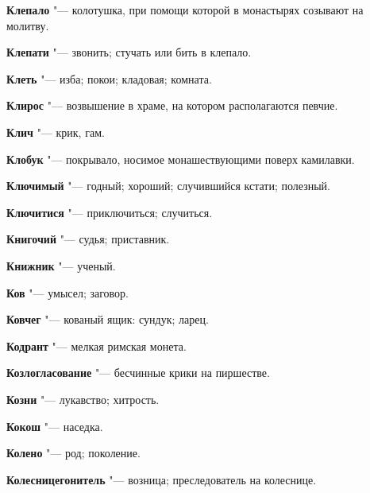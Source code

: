\begin{mymulticols}{2}
\noindent\textbf{Клепало} "--- колотушка, при помощи которой в монастырях созывают на молитву. 




\noindent\textbf{Клепати} "--- звонить; стучать или бить в клепало. 




\noindent\textbf{Клеть} "--- изба; покои; кладовая; комната. 




\noindent\textbf{Клирос} "--- возвышение в храме, на котором располагаются певчие. 




\noindent\textbf{Клич} "--- крик, гам. 




\noindent\textbf{Клобук} "--- покрывало, носимое монашествующими поверх камилавки. 




\noindent\textbf{Ключимый} "--- годный; хороший; случившийся кстати; полезный. 




\noindent\textbf{Ключитися} "--- приключиться; случиться. 




\noindent\textbf{Книгочий} "--- судья; приставник. 




\noindent\textbf{Книжник} "--- ученый. 




\noindent\textbf{Ков} "--- умысел; заговор. 




\noindent\textbf{Ковчег} "--- кованый ящик: сундук; ларец. 




\noindent\textbf{Кодрант} "--- мелкая римская монета. 




\noindent\textbf{Козлогласование} "--- бесчинные крики на пиршестве. 




\noindent\textbf{Козни} "--- лукавство; хитрость. 




\noindent\textbf{Кокош} "--- наседка. 




\noindent\textbf{Колено} "--- род; поколение. 




\noindent\textbf{Колесницегонитель} "--- возница; преследователь на колеснице. 





\end{mymulticols}
